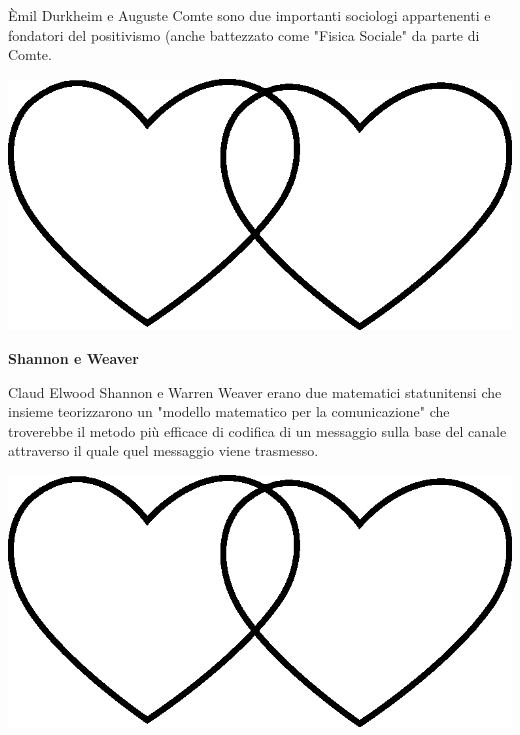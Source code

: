 \documentclass[11pt]{extarticle}
\begin{document}
\begin{center}
Èmil Durkheim e Auguste Comte sono due importanti sociologi appartenenti e fondatori del positivismo (anche battezzato come "Fisica Sociale" da parte di Comte.\\
\begin{center}
\includegraphics[scale=0.1]{img/cuori_venn.eps}\\
\end{center}
\end{center}
\vspace*{\fill}
\newpage
\begin{center}
\vspace*{\fill}
{\Huge \textbf{Shannon e Weaver\\}}
\vspace*{\fill}
\end{center}
\newpage
{}
\vspace*{\fill}
\begin{center}
Claud Elwood Shannon e Warren Weaver erano due matematici statunitensi che insieme teorizzarono un "modello matematico per la comunicazione" che troverebbe il metodo più efficace di codifica di un messaggio sulla base del canale attraverso il quale quel messaggio viene trasmesso.\\
\begin{center}
\includegraphics[scale=0.1]{img/cuori_venn.eps}\\
\end{center}
\end{center}
\end{document}
